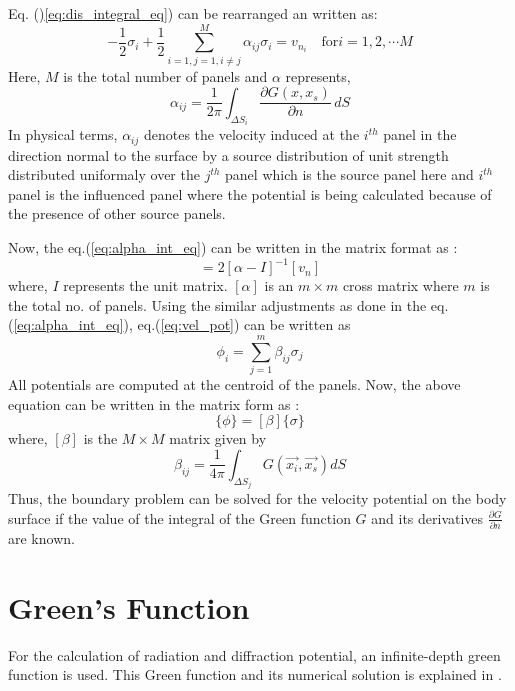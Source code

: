 Eq. ()\ref{eq:dis_integral_eq}) can be rearranged an written as:
\begin{equation}
    \label{eq:alpha_int_eq}
    -\frac{1}{2}\sigma_i + \frac{1}{2}\sum_{i=1, j=1, i\ne j}^{M}\alpha_{ij}\sigma_i = v_{n_i} \quad \text{for} i = 1, 2, \cdots M
\end{equation}
Here, $M$ is the total number of panels and $\alpha$ represents, 
\begin{equation}
    \label{eq:alpha}
    \alpha_{ij} = \frac{1}{2\pi}\int_{\Delta S_i}\frac{\partial G(x, x_s)}{\partial n} \,dS
\end{equation}
In physical terms, $\alpha_{ij}$ denotes the velocity induced at the $i^{th}$ panel in the direction normal to the surface by a source distribution of unit strength distributed uniformaly over the $j^{th}$ panel which is the source panel here and $i^{th}$ panel is the influenced panel where the potential is being calculated because of the presence of other source panels.

Now, the eq.(\ref{eq:alpha_int_eq}) can be written in the matrix format as :
\begin{equation}
    [\sigma] = 2[\alpha - I]^{-1}[v_n]
\end{equation}
where, $I$ represents the unit matrix. $[\alpha]$ is an $m\times m$ cross matrix where $m$ is the total no. of panels. Using the similar adjustments as done in the eq.(\ref{eq:alpha_int_eq}), eq.(\ref{eq:vel_pot}) can be written as
\begin{equation}
    \phi_i = \sum_{j=1}^{m}\beta_{ij}\sigma_{j}
\end{equation}
All potentials are computed at the centroid of the panels. Now, the above equation can be written in the matrix form as :
\begin{equation}
    \{\phi\} = [\beta]\{\sigma\}
\end{equation}
where, $[\beta]$ is the $M\times M$ matrix given by
\begin{equation}
    \label{eq:beta_eq}
    \beta_{ij} = \frac{1}{4\pi}\int_{\Delta S_j}G(\Vec{x_i}, \vec{x_s}) dS  
\end{equation}
Thus, the boundary problem can be solved for the velocity potential on the body surface if the value of the integral of the Green function $G$ and its derivatives $\frac{\partial G}{\partial n}$ are known.
\section{Green's Function}
\label{sec:green_fun}
For the calculation of radiation and diffraction potential, an infinite-depth green function is used. This Green function and its numerical solution is explained in \cite{telste1986numerical}. 

